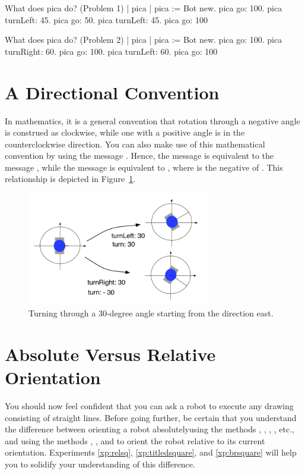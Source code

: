 \documentclass[a4paper,10pt,twoside]{book}
\begin{document}
\begin{script}[myster1]{What does pica do? (Problem 1)}
	| pica | 
	pica := Bot new. 
	pica go: 100. 
	pica turnLeft: 45. 
	pica go: 50. 
	pica turnLeft: 45. 
	pica go: 100 
\end{script}

\begin{script}[myster2]{What does pica do? (Problem 2)}
	| pica | 
	pica := Bot new. 
	pica go: 100. 
	pica turnRight: 60. 
	pica go: 100. 
	pica turnLeft: 60. 
	pica go: 100 
\end{script}


\section{A Directional Convention}

In mathematics, it is a general convention that rotation through a negative angle is construed 
as clockwise, while one with a positive angle is in the counterclockwise direction. You can also 
make use of this mathematical convention by using the message . Hence, the message 
 is equivalent to the message , while the message  is equivalent to , where  is the negative of . 
This relationship is depicted in Figure~\ref{fig:turnLeftWithMathematicalEq}. 


\begin{figure}
\begin{center}\includegraphics[width=8cm]{turnLeftWithMathematicalEq}
\caption{Turning through a 30-degree angle starting from the direction east. \label{fig:turnLeftWithMathematicalEq}}
\end{center}
\end{figure}





\section{Absolute Versus Relative Orientation}
You should now feel confident that you can ask a robot to execute any drawing consisting of 
straight lines. Before going further, be certain that you understand the difference between orienting 
a robot absolutelyusing the methods , , , , etc., and using the 
methods , , and  to orient the robot relative to its current orientation. Experiments \ref{xp:relsq}, \ref{xp:titledsquare}, and \ref{xp:brsquare} will help you to solidify your understanding of this difference. 
\end{document}
